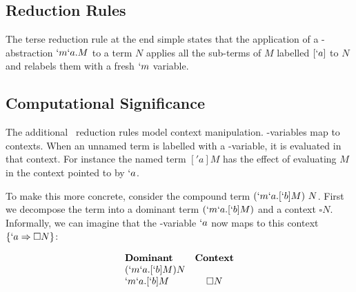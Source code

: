   \subsection{Reduction Rules}
  \begin{figure}[!h]
  \end{figure}

  The terse reduction rule at the end simple states that the application
  of a \lmu-abstraction $`m`a.M$ to a term $N$ applies all the sub-terms 
  of $M$ labelled $[`a]$ to $N$ and relabels them with a fresh $`m$ 
  variable.
  
  \subsection{Computational Significance}


  The additional \lmu\ reduction rules model context manipulation. 
  \lmu-variables map to contexts. When an unnamed term is labelled with a 
  \lmu-variable, it is evaluated in that context. For instance the named 
  term $['a]M$ has the effect of evaluating $M$ in the context pointed to 
  by $`a$.
  
  To make this more concrete, consider the compound term $(`m`a.[`b]M)\ N$. 
  First we decompose the term into a dominant term $(`m`a.[`b]M)$ and a 
  context $\square N$. Informally, we can imagine that the \lmu-variable 
  $`a$ now maps to this context $\{`a \Rightarrow \square N\}$:
  
  \begin{example}[]
    \[
    \begin{array}{lc}
    \textbf{Dominant} & \textbf{Context} \\
    (`m`a.[`b]M) N \\
    `m`a.[`b]M & \square N \\
    \end{array}
    \]
  \end{example}

